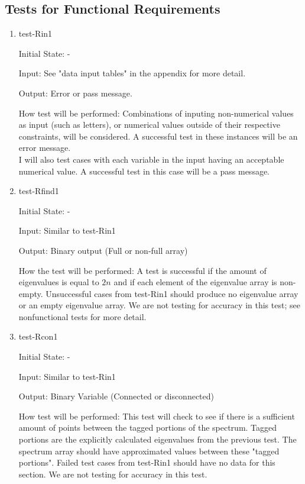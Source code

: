\documentclass[12pt, titlepage]{article}
\begin{document}
\subsection{Tests for Functional Requirements}

\begin{enumerate}
\item{test-Rin1\\}	
				
Initial State: -
					
Input: See "data input tables" in the appendix for more detail.
					
Output: Error or pass message.
					
How test will be performed: Combinations of inputing non-numerical values as 
input  (such as letters), or numerical values outside of their respective 
constraints, will be considered. A successful test in these instances will be 
an error message. \\
I will also test cases with each variable in the input having an 
acceptable numerical value. A successful test in this case will be a pass 
message. 
					
\item{test-Rfind1} 

Initial State: - 

Input: Similar to test-Rin1

Output: Binary output (Full or non-full array)

How the test will be performed: A test is successful if the amount of 
eigenvalues is equal to $2n$ and if each element of the eigenvalue array is 
non-empty. Unsuccessful cases from test-Rin1 should produce no eigenvalue array 
or an empty eigenvalue array. We are not testing for accuracy in this test; see 
nonfunctional tests for more detail. 

\item{test-Rcon1} 

Initial State: -

Input: Similar to test-Rin1

Output: Binary Variable (Connected or disconnected)

How test will be performed: This test will check to see if there is a 
sufficient amount of points between the tagged portions of the spectrum. Tagged 
portions are the explicitly calculated eigenvalues from the previous test. The 
spectrum array should have approximated values between these "tagged portions". 
Failed test cases from test-Rin1 should have no data for this section. 
We are not testing for accuracy in this test. 


\end{enumerate}
\end{document}
